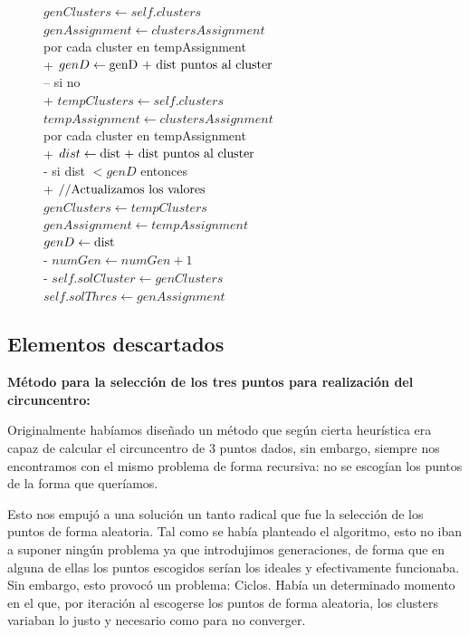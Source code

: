 \documentclass[conference,a4paper]{IEEEtran}
\begin{document}
\begin{figure}[H]
\begin{pseudo}
\(genClusters \leftarrow self.clusters\)\\
\(genAssignment \leftarrow clustersAssignment\)\\
por cada \textnormal{cluster en tempAssignment}\\+
\( genD \leftarrow \textnormal{genD + dist puntos al cluster}\) \\--
si no\\+
\(tempClusters \leftarrow self.clusters\)\\
\(tempAssignment \leftarrow clustersAssignment\)\\
por cada \textnormal{cluster en tempAssignment}\\+
\( dist \leftarrow \textnormal{dist + dist puntos al cluster}\) \\-
si \textnormal{dist $<genD$} entonces\\+
\( \textnormal{//Actualizamos los valores} \)\\
\(genClusters \leftarrow tempClusters\)\\
\(genAssignment \leftarrow tempAssignment\)\\
\( genD \leftarrow \textnormal{dist}\)\\-
\( numGen \leftarrow numGen + 1\)\\-
\(self.solCluster \leftarrow genClusters \) \\
\(self.solThres \leftarrow genAssignment \)
\end{pseudo}
\end{figure}

\subsection{Elementos descartados}

\textbf{Método para la selección de los tres puntos para realización del circuncentro:}

Originalmente habíamos diseñado un método que según cierta heurística era capaz de calcular el circuncentro de 3 puntos dados, sin embargo, siempre nos encontramos con el mismo problema de forma recursiva: no se escogían los puntos de la forma que queríamos.

Esto nos empujó a una solución un tanto radical que fue la selección de los puntos de forma aleatoria. Tal como se había planteado el algoritmo, esto no iban a suponer ningún problema ya que introdujimos generaciones, de forma que en alguna de ellas los puntos escogidos serían los ideales y efectivamente funcionaba.
Sin embargo, esto provocó un problema: Ciclos. Había un determinado momento en el que, por iteración al escogerse los puntos de forma aleatoria, los clusters variaban lo justo y necesario como para no converger.
\end{document}
